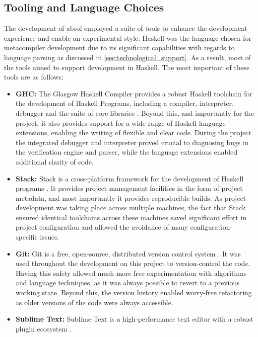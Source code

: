 
\subsection{Tooling and Language Choices} %
\label{sub:tooling_and_language_choices}
The development of \gls{absol} employed a suite of tools to enhance the development experience and enable an experimental style.
Haskell was the language chosen for metacompiler development due to its significant capabilities with regards to language parsing as discussed in \autoref{sec:technological_support}.
As a result, most of the tools aimed to support development in Haskell.
The most important of these tools are as follows:
\begin{itemize}
    \item \textbf{GHC:} The Glasgow Haskell Compiler provides a robust Haskell toolchain for the development of Haskell Programs, including a compiler, interpreter, debugger and the suite of core libraries \citep{ghc}. 
    Beyond this, and importantly for the project, it also provides support for a wide range of Haskell language extensions, enabling the writing of flexible and clear code.
    During the project the integrated debugger and interpreter proved crucial to diagnosing bugs in the verification engine and parser, while the language extensions enabled additional clarity of code.
    \item \textbf{Stack:} Stack is a cross-platform framework for the development of Haskell programs \citep{haskellstack}.
    It provides project management facilities in the form of project metadata, and most importantly it provides reproducible builds. 
    As project development was taking place across multiple machines, the fact that Stack ensured identical toolchains across these machines saved significant effort in project configuration and allowed the avoidance of many configuration-specific issues. 
    \item \textbf{Git:} Git is a free, open-source, distributed version control system \citep{git_scm}. 
    It was used throughout the development on this project to version-control the code.
    Having this safety allowed much more free experimentation with algorithms and language techniques, as it was always possible to revert to a previous working state. 
    Beyond this, the version history enabled worry-free refactoring as older versions of the code were always accessible. 
    \item \textbf{Sublime Text:} Sublime Text is a high-performance text editor with a robust plugin ecosystem \citep{sublime_text}.

\end{itemize}
